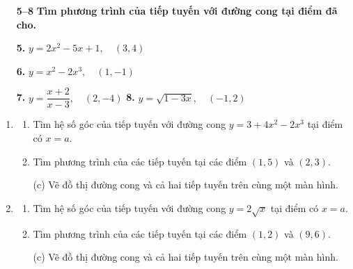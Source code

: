 \begin{minipage}[t]{0.485\textwidth}
\begin{enumerate}[label=\textbf{\arabic*.}, leftmargin=1.4em, labelsep=0.4em, itemsep=0.6em, topsep=0pt, parsep=0pt]
    \vspace{0.1em}
    \noindent\textbf{\color{stewartcyan}5--8}\; \textsf{\textbf{Tìm phương trình của tiếp tuyến với đường cong tại điểm đã cho.}}\par\vspace{0.2em}

    \item[\textbf{5.}] $y = 2x^2 - 5x + 1, \quad (3, 4)$
    \item[\textbf{6.}] $y = x^2 - 2x^3, \quad (1, -1)$
    \item[\textbf{7.}] $y = \dfrac{x + 2}{x - 3}, \quad (2, -4)$ \hfill \textbf{8.}\; $y = \sqrt{1 - 3x}, \quad (-1, 2)$
  \end{enumerate}

  \vspace{0.3em}
  \noindent{\color{stewartcyan}\rule{\linewidth}{0.65pt}}
  \vspace{0.3em}

  \begin{enumerate}[resume*]
    \item 
      \begin{enumerate}[label=(\alph*), leftmargin=1.3em, labelsep=0.35em, itemsep=1.5pt, topsep=0pt]
        \item Tìm hệ số góc của tiếp tuyến với đường cong $y = 3 + 4x^2 - 2x^3$ tại điểm có $x = a$.
        \item Tìm phương trình của các tiếp tuyến tại các điểm $(1, 5)$ và $(2, 3)$.
        \item[\llap{\graphicon\hspace{0.35em}}(c)] Vẽ đồ thị đường cong và cả hai tiếp tuyến trên cùng một màn hình.
      \end{enumerate}

    \item 
      \begin{enumerate}[label=(\alph*), leftmargin=1.3em, labelsep=0.35em, itemsep=1.5pt, topsep=0pt]
        \item Tìm hệ số góc của tiếp tuyến với đường cong $y = 2\sqrt{x}$ tại điểm có $x = a$.
        \item Tìm phương trình của các tiếp tuyến tại các điểm $(1, 2)$ và $(9, 6)$.
        \item[\llap{\graphicon\hspace{0.35em}}(c)] Vẽ đồ thị đường cong và cả hai tiếp tuyến trên cùng một màn hình.
      \end{enumerate}


\end{enumerate}
\end{minipage}
